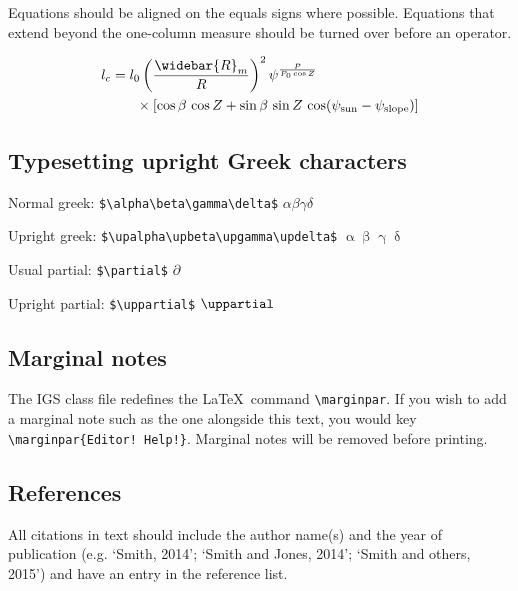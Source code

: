 \documentclass[review,aog]{igs}
\begin{document}
Equations should be aligned on the equals signs where possible. Equations that extend beyond the one-column measure should be turned over before an operator. 

\begin{equation}
\label{eqnarrayexample}
\begin{aligned}
l_c & =  l_0 \left(\frac{\widebar{R}_m}{R} \right)^2
  \psi^{\frac{P}{P_0\cos Z}}\\
    & \phantom{=} \quad  \times [\cos\beta\, \cos Z
    + \sin\beta\,\sin Z\,\cos(\psi_\mathrm{sun}
    - \psi_\mathrm{slope})]
\end{aligned}
\end{equation}

\subsection{Typesetting upright Greek characters}

Normal greek: \verb|$\alpha\beta\gamma\delta$|
$\alpha\beta\gamma\delta$ 

Upright greek:  \verb|$\upalpha\upbeta\upgamma\updelta$|
$\upalpha\upbeta\upgamma\updelta$

Usual partial: \verb|$\partial$| $\partial$

Upright partial: \verb|$\uppartial$| $\uppartial$

\subsection{Marginal notes}

The IGS class file redefines the \LaTeX\ command \verb"\marginpar". If you wish to add a marginal note such as the one alongside this text, you would key \verb"\marginpar{Editor! Help!}". Marginal notes will be removed before printing.

\subsection{References}

All citations in text should include the author name(s) and the year of publication (e.g. `Smith, 2014'; `Smith and Jones, 2014'; `Smith and others, 2015') and have an entry in the reference list. 
\end{document}
